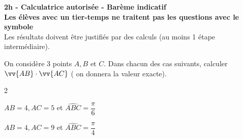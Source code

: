 \documentclass[12pt,a4paper]{article}  %
\begin{document}
\graphicspath{{../images/}}

\begin{center}

\end{center}


\begin{center}\textbf{2h - Calculatrice autorisée - Barème indicatif}\\
\textbf{Les élèves avec un tier-temps ne traitent pas les questions avec  le symbole }\\
Les résultats doivent être justifiés par des calculs (au moins 1 étape intermédiaire).
\end{center}

%

\vspace{-.3cm} 
On considère 3 points $A, B$ et $C$. Dans chacun des cas suivants, calculer $\vv{A B} \cdot \vv{A C}$ ( on donnera la valeur exacte).
\begin{multicols}{2}
\begin{enumMet}
    \item $A B=4, A C=5$ et $\widehat{A B C}=\dfrac{\pi}{6}$
    \item {} $A B=4, A C=9$ et $\widehat{A B C}=\dfrac{\pi}{4}$
\end{enumMet}
\end{multicols}
\end{document}
